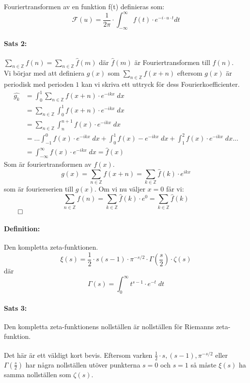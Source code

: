\documentclass{article}%
\begin{document}
Fouriertransformen av en funktion f(t) definieras som:
$$\mathcal{F}(u) = \frac 1 {2\pi} \cdot \int_{-\infty}^\infty f(t) \cdot e^{- i \cdot u \cdot t} dt$$
\pagebreak
\paragraph{Sats 2:} 
$\sum\limits_{n \in \mathbb{Z}} f(n) = \sum\limits_{n \in \mathbb{Z}} \hat{f}(m)$ där $\hat{f}(m)$ är Fouriertransformen till $f(n)$. \\
Vi börjar med att definiera $g(x)$ som $\sum\limits_{n \in \mathbb{Z}} f(x + n)$ eftersom $g(x)$ är periodisk med perioden $1$
kan vi skriva ett uttryck för dess Fourierkoefficienter.
\begin{align*}
	\hat{g_k} &= \int_0^1 \sum_{n \in \mathbb{Z}} f(x + n) \cdot e^{-ikx}\; dx \\
			  &= \sum_{n \in \mathbb{Z}} \int_0^1 f(x + n) \cdot e^{-ikx}\; dx \\
			  &= \sum_{n \in \mathbb{Z}} \int_n^{n + 1} f(x) \cdot e^{-ikx}\; dx \\
			  &= ... \int_{-1}^0 f(x) \cdot e^{-ikx}\; dx + \int_0^1 f(x) - e^{-ikx}\; dx + \int_1^2 f(x) \cdot e^{-ikx}\; dx ... \\
			  &= \int_{- \infty}^\infty f(x) \cdot e^{-ikx}\; dx = \hat{f}(x)
\end{align*}
Som är fouriertransformen av $f(x)$.
$$g(x) = \sum_{n \in \mathbb{Z}} f(x + n) = \sum_{k \in \mathbb{Z}} \hat{f}(k) \cdot e^{ikx}$$%
som är fourierserien till $g(x)$. Om vi nu väljer $x = 0$ får vi:
$$\sum_{n \in \mathbb{Z}} f(n) = \sum_{k \in \mathbb{Z}} \hat{f}(k) \cdot e^0 = \sum_{k \in \mathbb{Z}} \hat{f}(k)$$
$\hfill \qed$
\paragraph{Definition:}
Den kompletta zeta-funktionen.\\
$$\xi (s) = \frac 1 2 \cdot s(s - 1) \cdot \pi^{-s/2} \cdot \Gamma(\frac s 2) \cdot \zeta(s) $$
där
$$\Gamma(s) = \int_0^\infty t^{s - 1} \cdot e^{-t}\; dt$$

\pagebreak
\paragraph{Sats 3:} Den kompletta zeta-funktionens nollställen är nollställen för Riemanns zeta-funktion. \\
\\
Det här är ett väldigt kort bevis. Eftersom varken ${\frac 1 2 \cdot s, (s - 1), \pi^{-s/2}}$ eller $\Gamma(\frac s 2)$
har några nollställen utöver punkterna $s = 0$ och $s = 1$ så måste $\xi(s)$ ha samma nollställen som $\zeta(s)$.
\end{document}

